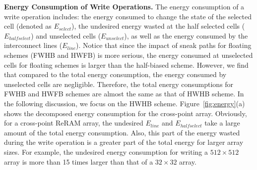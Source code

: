 \vspace{5pt}\noindent\textbf{Energy Consumption of Write Operations.}
%
The energy consumption of a write operation includes: the energy consumed
to change the state of the selected cell (denoted as $E_{select}$), the
undesired energy wasted at the half selected cells ($E_{halfselect}$) and
unselected cells ($E_{unselect}$), as well as the energy consumed by the
interconnect lines ($E_{line}$). Notice that since the impact of sneak
paths for floating schemes (FWHB and HWFB) is more serious, the energy
consumed at unselected cells for floating schemes is larger than the
half-biased scheme. However, we find that compared to the total energy
consumption, the energy consumed by unselected cells are negligible.
Therefore, the total energy consumptions for FWHB and HWFB schemes are
almost the same as that of HWHB scheme. In the following discussion, we
focus on the HWHB scheme. Figure~\ref{fig:energy}(a) shows the decomposed
energy consumption for the cross-point array. Obviously, for a cross-point ReRAM array, the undesired $E_{line}$ and $E_{halfselect}$ take a large
amount of the total energy consumption. Also, this part of the energy wasted during the write operation is a greater part of the total energy for larger array sizes. For example, the undesired energy consumption for
writing a $512{\times}512$ array is more than 15 times larger than that of a $32{\times}32$ array.

